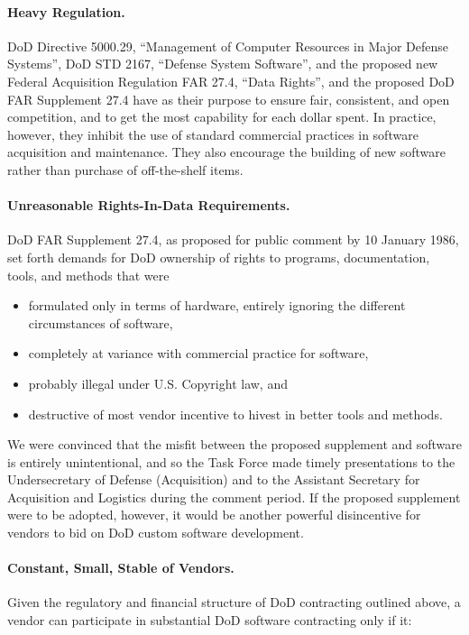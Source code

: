 \documentclass[12pt,final]{article}
\begin{document}
\paragraph{Heavy Regulation.} DoD Directive 5000.29, “Management of Computer
Resources in Major Defense Systems”, DoD STD 2167, “Defense System Software”,
and the proposed new Federal Acquisition Regulation FAR 27.4, “Data Rights”,
and the proposed DoD FAR Supplement 27.4 have as their purpose to ensure fair,
consistent, and open competition, and to get the most capability for each
dollar spent. In practice, however, they inhibit the use of standard commercial
practices in software acquisition and maintenance. They also encourage the
building of new software rather than purchase of off-the-shelf items.

\paragraph{Unreasonable Rights-In-Data Requirements.}  DoD FAR Supplement 27.4,
as proposed for public comment by 10 January 1986, set forth demands for DoD
ownership of rights to programs, documentation, tools, and methods that were

\begin{itemize}
    \item formulated only in terms of hardware, entirely ignoring the different circumstances of software,
    \item completely at variance with commercial practice for software,
    \item probably illegal under U.S. Copyright law, and
    \item destructive of most vendor incentive to hivest in better tools and methods.
\end{itemize}

We were convinced that the misfit between the proposed supplement and software
is entirely unintentional, and so the Task Force made timely presentations to
the Undersecretary of Defense (Acquisition) and to the Assistant Secretary for
Acquisition and Logistics during the comment period. If the proposed supplement
were to be adopted, however, it would be another powerful disincentive for
vendors to bid on DoD custom software development.

\paragraph{Constant, Small, Stable of Vendors.} Given the regulatory and
financial structure of DoD contracting outlined above, a vendor can participate
in substantial DoD software contracting only if it:
\end{document}
